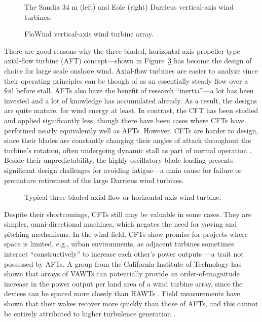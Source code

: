 \begin{figure}[ht]
    \caption{The Sandia 34 m (left) and Eole (right) Darrieus vertical-axis wind
        turbines.}
    
    \label{fig:Darrieus}
\end{figure}

\begin{figure}[ht]
    \caption{FloWind vertical-axis wind turbine array.}
    
    \label{fig:FloWind}
\end{figure}

There are good reasons why the three-bladed, horizontal-axis propeller-type
axial-flow turbine (AFT) concept---shown in Figure~\ref{fig:AFT} has become the
design of choice for large scale onshore wind. Axial-flow turbines are easier to
analyze since their operating principles can be though of as an essentially
steady flow over a foil before stall. AFTs also have the benefit of research
``inertia''---a lot has been invested and a lot of knowledge has accumulated
already. As a result, the designs are quite mature, for wind energy at least. In
contrast, the CFT has been studied and applied significantly less, though there
have been cases where CFTs have performed nearly equivalently well as AFTs.
However, CFTs are harder to design, since their blades are constantly changing
their angles of attack throughout the turbine's rotation, often undergoing
dynamic stall as part of normal operation \cite{Para2002}. Beside their
unpredictability, the highly oscillatory blade loading presents significant
design challenges for avoiding fatigue---a main cause for failure or premature
retirement of the large Darrieus wind turbines.

\begin{figure}[ht]
    \caption{Typical three-bladed axial-flow or horizontal-axis wind turbine.}
    
    \label{fig:AFT}
\end{figure}

Despite their shortcomings, CFTs still may be valuable in some cases. They are
simpler, omni-directional machines, which negates the need for yawing and
pitching mechanisms. In the wind field, CFTs show promise for projects where
space is limited, e.g., urban environments, as adjacent turbines sometimes
interact ``constructively'' to increase each other's power outputs
\cite{Li2010}---a trait not possessed by AFTs. A group from the California
Institute of Technology has shown that arrays of VAWTs can potentially provide
an order-of-magnitude increase in the power output per land area of a wind
turbine array, since the devices can be spaced more closely than HAWTs
\cite{Dabiri2011}. Field measurements have shown that their wakes recover more
quickly than those of AFTs, and this cannot be entirely attributed to higher
turbulence generation \cite{Kinzel2012}.

